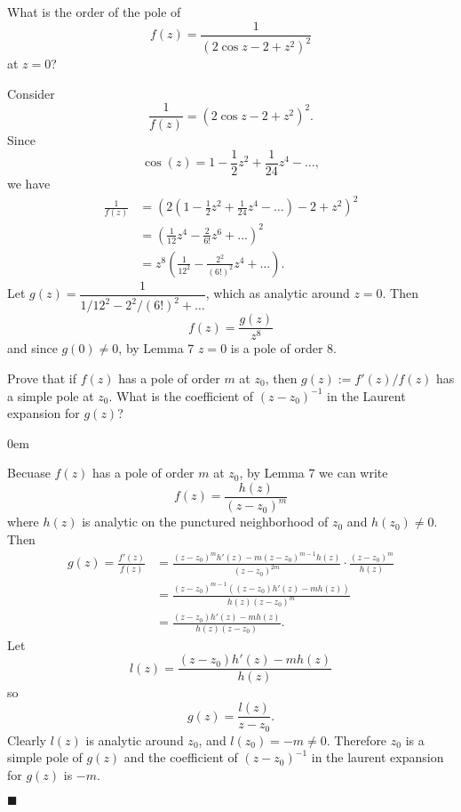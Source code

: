 \documentclass[12pt]{article}
\author{Warren Atkison}
\date{\today}
\renewcommand{\qed}{\hfill$\blacksquare$}
\renewenvironment{proof}{\vspace{1em}\begin{addmargin}[2em]{0em}\begin{newproof}}{\end{newproof}\end{addmargin}\qed}
\newenvironment{exercise}[2][Exercise]{\begin{trivlist}
\item[\hskip \labelsep {\bfseries #1} \hskip \labelsep {\bfseries #2.}]}{\end{trivlist}}
\begin{document}
\fancyhf{}
\fancyhead[R]{\today}
\fancyfoot[R]{\thepage}

\begin{exercise}{2}
	What is the order of the pole of
	\[
		f(z) = \frac{1}{\left(2\cos z - 2 + z^2\right)^2}
	\]
	at $z = 0$?
\end{exercise}
Consider
\[
	\frac{1}{f(z)} = \left(2\cos z - 2 + z^2\right)^2.
\]
Since
\[
	\cos(z) = 1 - \frac{1}{2}z^2 + \frac{1}{24}z^4 - \ldots,
\]
we have
\begin{align*}
	\frac{1}{f(z)} &= \left(2\left(1 - \frac{1}{2}z^2 + \frac{1}{24}z^4 - \ldots\right) - 2 + z^2\right)^2 \\
		       &= \left(\frac{1}{12}z^4 - \frac{2}{6!}z^6 + \ldots \right)^2 \\
		       &= z^8\left(\frac{1}{12^2} - \frac{2^2}{(6!)^2}z^4 + \ldots\right).
\end{align*}
Let $g(z) = \dfrac{1}{1/12^2 - 2^2/(6!)^2 + \ldots}$, which as analytic around $z = 0$. Then
\[
	f(z) = \frac{g(z)}{z^8}
\]
and since $g(0) \neq 0$, by Lemma 7 $z = 0$ is a pole of order 8.
\begin{exercise}{12}
	Prove that if $f(z)$ has a pole of order $m$ at $z_0$, then $g(z) := f'(z)/f(z)$ has a simple pole at $z_0$. What is the coefficient of $(z - z_0)^{-1}$ in the Laurent expansion for $g(z)$?
\end{exercise}	
\begin{proof}
	Becuase $f(z)$ has a pole of order $m$ at $z_0$, by Lemma 7 we can write
	\[
		f(z) = \frac{h(z)}{(z - z_0)^m}
	\]
	where $h(z)$ is analytic on the punctured neighborhood of $z_0$ and $h(z_0) \neq 0$. Then
	\begin{align*}
		g(z) = \frac{f'(z)}{f(z)} &= \frac{(z-z_0)^mh'(z) - m(z - z_0)^{m-1}h(z)}{(z - z_0)^{2m}}\cdot \frac{(z-z_0)^m}{h(z)} \\
					  &= \frac{(z-z_0)^{m-1}((z-z_0)h'(z)-mh(z))}{h(z)(z-z_0)^m} \\
					  &= \frac{(z-z_0)h'(z) - mh(z)}{h(z)(z-z_0)}.
	\end{align*}
	Let
	\[
		l(z) = \frac{(z-z_0)h'(z) - mh(z)}{h(z)}
	\]
	so
	\[
		g(z) = \frac{l(z)}{z-z_0}.	
	\]
	Clearly $l(z)$ is analytic around $z_0$, and $l(z_0) = -m \neq 0$. Therefore $z_0$ is a simple pole of $g(z)$ and the coefficient of $(z - z_0)^{-1}$ in the laurent expansion for $g(z)$ is $-m$.
\end{proof}
\end{document}
